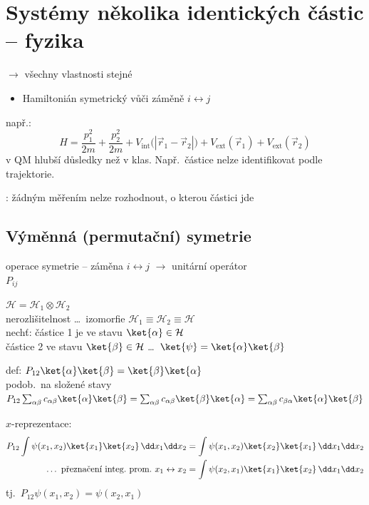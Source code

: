 \section{Systémy několika identických částic -- fyzika}

 $\to$ všechny vlastnosti stejné
\begin{itemize}[nosep]
  \item[--] Hamiltonián symetrický vůči záměně $i\leftrightarrow j$
\end{itemize}
např.:
\[
  H = \frac{p_1^2}{2m} + \frac{p_2^2}{2m} + V_{\text{int}}\big(|\vec r_1 - \vec r_2|\big) + V_{\text{ext}}(\vec r_1) + V_{\text{ext}}(\vec r_2)
\]
v QM hlubší důsledky než v klas. Např.\ částice nelze identifikovat podle trajektorie.

: žádným měřením nelze rozhodnout, o kterou částici jde

\subsection*{Výměnná (permutační) symetrie}
operace symetrie -- záměna $i\leftrightarrow j$ $\to$ unitární operátor \\
 $P_{ij}$

\begin{priklad}
$\mathcal{H} = \mathcal{H}_1\otimes\mathcal{H}_2$ \\
nerozlišitelnost \dots\ izomorfie $\mathcal{H}_1\equiv\mathcal{H}_2\equiv\mathcal{H}$ \\
nechť: částice 1 je ve stavu $\ket{\alpha}\in\mathcal{H}$ \\
\phantom{nechť:} částice 2 \phantom{je} ve stavu $\ket{\beta}\in\mathcal{H}$ \quad \dots\ $\ket{\psi} = \ket{\alpha}\ket{\beta}$

def: \quad $P_{12}\ket{\alpha}\ket{\beta} = \ket{\beta}\ket{\alpha}$ \\
podob.\ na složené stavy \quad
$P_{12}\sum_{\alpha\beta}c_{\alpha\beta}\ket{\alpha}\ket{\beta} = \sum_{\alpha\beta}c_{\alpha\beta}\ket{\beta}\ket{\alpha} = \sum_{\alpha\beta}c_{\beta\alpha}\ket{\alpha}\ket{\beta}$

$x$-reprezentace:
\begin{align*}
  P_{12}\int\psi(x_1,x_2)\ket{x_1}\ket{x_2}\,\dd x_1\dd x_2 &= \int\psi(x_1,x_2)\ket{x_2}\ket{x_1}\,\dd x_1\dd x_2 \\
  \dots\ \text{přeznačení integ.\ prom.\ } x_1\leftrightarrow x_2 &= \int\psi(x_2,x_1)\ket{x_1}\ket{x_2}\,\dd x_1\dd x_2
\end{align*}
tj.\ \quad $P_{12}\psi(x_1,x_2) = \psi(x_2,x_1)$
\end{priklad}

